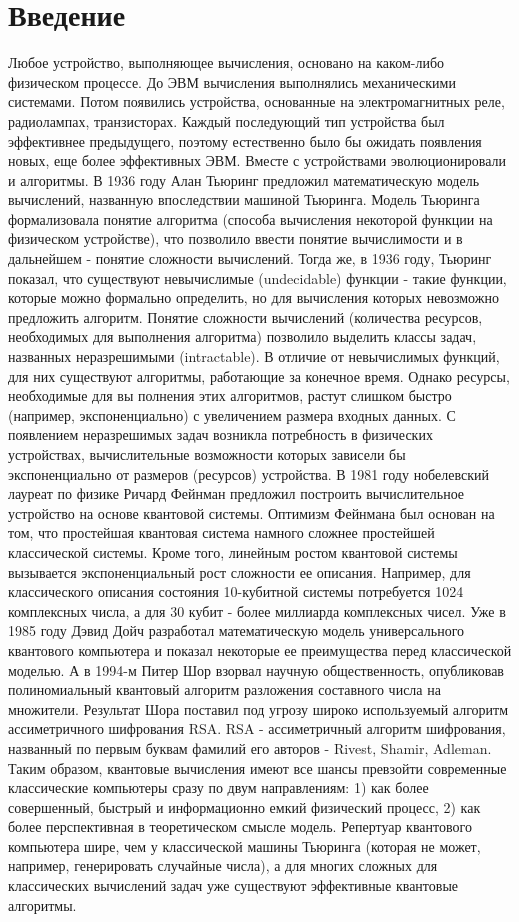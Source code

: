 \documentclass[14pt]{article}
\newcommand{\anonsection}[1]{\section*{#1}\addcontentsline{toc}{section}{#1}}
\begin{document}
	\tableofcontents 
	
	\newpage
	\anonsection{Введение}
	
Любое устройство, выполняющее вычисления, основано на каком-либо физическом процессе. До ЭВМ вычисления выполнялись механическими системами. Потом появились устройства, основанные на электромагнитных реле, радиолампах, транзисторах. Каждый последующий тип устройства был эффективнее предыдущего, поэтому естественно было бы ожидать появления новых, еще более эффективных ЭВМ. Вместе с устройствами эволюционировали и алгоритмы. В 1936 году Алан Тьюринг предложил математическую модель вычислений, названную впоследствии машиной Тьюринга.
Модель Тьюринга формализовала понятие алгоритма (способа вычисления некоторой функции на физическом устройстве), что позволило ввести понятие вычислимости и в дальнейшем - понятие сложности вычислений. Тогда же, в 1936 году, Тьюринг показал, что существуют невычислимые (undecidable) функции - такие функции, которые можно формально определить, но для вычисления которых невозможно предложить алгоритм. 
Понятие сложности вычислений (количества ресурсов, необходимых для выполнения алгоритма) позволило выделить классы задач, названных неразрешимыми (intractable). В отличие от невычислимых функций, для них существуют алгоритмы, работающие за конечное время. Однако ресурсы, необходимые для вы полнения этих алгоритмов, растут слишком быстро (например, экспоненциально) с увеличением размера входных данных. С появлением неразрешимых задач возникла потребность в физических устройствах, вычислительные возможности которых зависели бы экспоненциально от размеров (ресурсов) устройства.
В 1981 году нобелевский лауреат по физике Ричард Фейнман предложил построить вычислительное устройство на основе квантовой системы. Оптимизм Фейнмана был основан на том, что простейшая квантовая система намного сложнее простейшей классической системы. Кроме того, линейным ростом квантовой системы вызывается экспоненциальный рост сложности ее описания. Например, для классического описания состояния 10-кубитной системы потребуется 1024 комплексных числа, а для 30 кубит - более миллиарда комплексных чисел.
Уже в 1985 году Дэвид Дойч разработал математическую модель универсального квантового компьютера и показал некоторые ее преимущества перед классической моделью. А в 1994-м Питер Шор взорвал научную общественность, опубликовав полиномиальный квантовый алгоритм разложения составного числа на множители. Результат Шора поставил под угрозу широко используемый алгоритм ассиметричного шифрования RSA.
RSA - ассиметричный алгоритм шифрования, названный по первым
буквам фамилий его авторов - Rivest, Shamir, Adleman.
Таким образом, квантовые вычисления имеют все шансы превзойти современные классические компьютеры сразу по двум направлениям: 1) как более совершенный, быстрый и информационно емкий физический процесс, 2) как более перспективная в теоретическом смысле модель. Репертуар квантового компьютера шире, чем у классической машины Тьюринга (которая не может, например, генерировать случайные числа), а для многих сложных для классических вычислений задач уже существуют эффективные квантовые алгоритмы.
\end{document}
